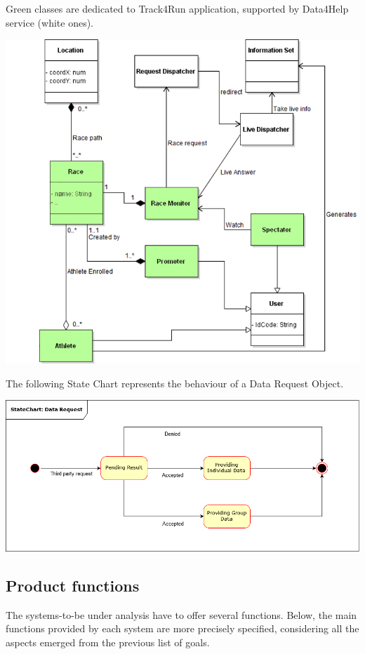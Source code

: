 \begin{minipage}{\textwidth}
{\color{LimeGreen} Green classes} are dedicated to {\color{LimeGreen} Track4Run} application, supported by Data4Help service (white ones).
\begin{center}
\includegraphics[scale=0.7]{Images/Class_Track4Run.png}
\\[1 cm]
\end{center}
The following State Chart represents the behaviour of a Data Request Object.
\begin{center}
\includegraphics[scale=0.5]{Images/StateChart.png}
\end{center}
\end{minipage}


\subsection{Product functions}
The systems-to-be under analysis have to offer several functions. Below, the main functions provided by each system are more precisely specified, considering all the aspects emerged from the previous list of goals.
